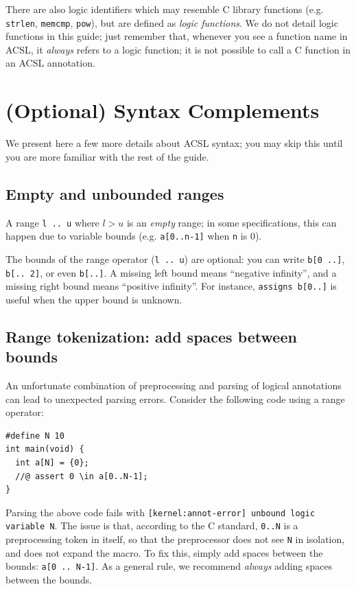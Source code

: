 \documentclass[web]{frama-c-book}
\begin{document}
There are also logic identifiers which may resemble C library functions
(e.g. \texttt{strlen}, \texttt{memcmp}, \texttt{pow}), but are defined
as {\em logic functions}. We do not detail logic functions in this guide;
just remember that, whenever you see a function name in ACSL,
it {\em always} refers to a logic function; it is not possible to call
a C function in an ACSL annotation.

\section{(Optional) Syntax Complements}
\label{sec:acsl-guide-complements}

We present here a few more details about ACSL syntax; you may skip this until
you are more familiar with the rest of the guide.

\subsection*{Empty and unbounded ranges}

A range \texttt{l .. u} where $l > u$ is an {\em empty} range; in some
specifications, this can happen due to variable bounds
(e.g. \texttt{a[0..n-1]} when \texttt{n} is 0).

The bounds of the range operator (\texttt{l .. u}) are optional: you can write
\texttt{b[0 ..]}, \texttt{b[.. 2]}, or even \texttt{b[..]}. A missing left
bound means ``negative infinity'', and a missing right bound means
``positive infinity''. For instance, \texttt{assigns b[0..]} is useful when
the upper bound is unknown.

\subsection*{Range tokenization: add spaces between bounds}

An unfortunate combination of preprocessing and parsing of logical annotations
can lead to unexpected parsing errors. Consider the following code using
a range operator:

\begin{lstlisting}
#define N 10
int main(void) {
  int a[N] = {0};
  //@ assert 0 \in a[0..N-1];
}
\end{lstlisting}

Parsing the above code fails with
\texttt{[kernel:annot-error] unbound logic variable N}.
The issue is that, according to the C standard, \texttt{0..N} is a preprocessing token
in itself, so that the preprocessor does not see \texttt{N} in isolation, and does not expand
the macro. To fix this, simply add spaces between the bounds:
\texttt{a[0 .. N-1]}.
As a general rule, we recommend {\em always} adding spaces between the bounds.
\end{document}
